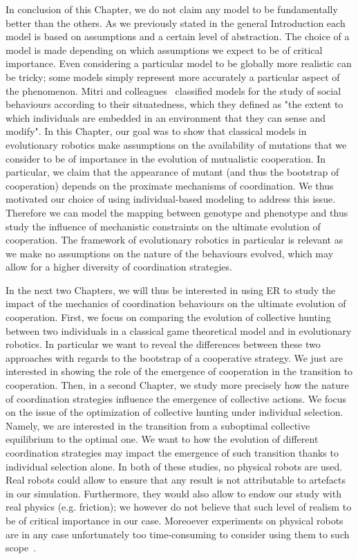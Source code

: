     In conclusion of this Chapter, we do not claim any model to be fundamentally better than the others. As we previously stated in the general Introduction each model is based on assumptions and a certain level of abstraction. The choice of a model is made depending on which assumptions we expect to be of critical importance. Even considering a particular model to be globally more realistic can be tricky; some models simply represent more accurately a particular aspect of the phenomenon. Mitri and colleagues~\parencite{Mitri2013} classified models for the study of social behaviours according to their situatedness, which they defined as "the extent to which individuals are embedded in an environment that they can sense and modify". In this Chapter, our goal was to show that classical models in evolutionary robotics make assumptions on the availability of mutations that we consider to be of importance in the evolution of mutualistic cooperation. In particular, we claim that the appearance of mutant (and thus the bootstrap of cooperation) depends on the proximate mechanisms of coordination. We thus motivated our choice of using individual-based modeling to address this issue. Therefore we can model the mapping between genotype and phenotype and thus study the influence of mechanistic constraints on the ultimate evolution of cooperation. The framework of evolutionary robotics in particular is relevant as we make no assumptions on the nature of the behaviours evolved, which may allow for a higher diversity of coordination strategies.

    In the next two Chapters, we will thus be interested in using ER to study the impact of the mechanics of coordination behaviours on the ultimate evolution of cooperation. First, we focus on comparing the evolution of collective hunting between two individuals in a classical game theoretical model and in evolutionary robotics. In particular we want to reveal the differences between these two approaches with regards to the bootstrap of a cooperative strategy. We just are interested in showing the role of the emergence of cooperation in the transition to cooperation. Then, in a second Chapter, we study more precisely how the nature of coordination strategies influence the emergence of collective actions. We focus on the issue of the optimization of collective hunting under individual selection. Namely, we are interested in the transition from a suboptimal collective equilibrium to the optimal one. We want to how the evolution of different coordination strategies may impact the emergence of such transition thanks to individual selection alone. In both of these studies, no physical robots are used. Real robots could allow to ensure that any result is not attributable to artefacts in our simulation. Furthermore, they would also allow to endow our study with real physics (e.g. friction); we however do not believe that such level of realism to be of critical importance in our case. Moreoever experiments on physical robots are in any case unfortunately too time-consuming to consider using them to such scope~\parencite{Mitri2013, Doncieux2015a}.

